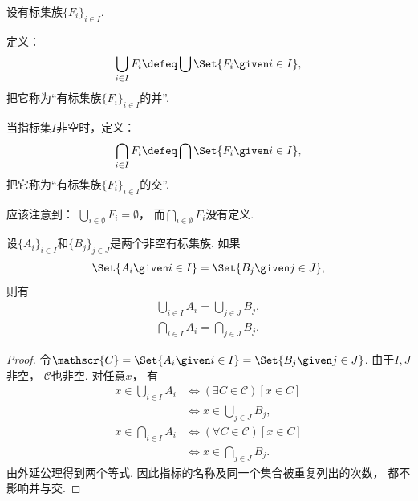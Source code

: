 \begin{definition}
设有标集族\(\{F_i\}_{i \in I}\).

定义：\begin{equation}
	\bigcup_{i \in I} F_i
	\defeq
	\bigcup\Set{ F_i \given i \in I },
\end{equation}
把它称为“有标集族\(\{F_i\}_{i \in I}\)的并”.

当指标集\(I\)非空时，定义：
\begin{equation}
	\bigcap_{i \in I} F_i
	\defeq
	\bigcap\Set{ F_i \given i \in I },
\end{equation}
把它称为“有标集族\(\{F_i\}_{i \in I}\)的交”.
\end{definition}
应该注意到：
\(\bigcup_{i \in \emptyset} F_i = \emptyset\)，
而\(\bigcap_{i \in \emptyset} F_i\)没有定义.

\begin{theorem}
    设\(\{A_i\}_{i \in I}\)和\(\{B_j\}_{j \in J}\)是两个非空有标集族.
    如果
    \begin{equation*}
        \Set{ A_i \given i \in I }
        = \Set{ B_j \given j \in J },
    \end{equation*}
    则有
    \begin{gather}
        \bigcup_{i \in I} A_i = \bigcup_{j \in J} B_j, \\
        \bigcap_{i \in I} A_i = \bigcap_{j \in J} B_j.
    \end{gather}
    \begin{proof}
        令\(\mathscr{C}=\Set{A_i\given i\in I}=\Set{B_j\given j\in J}\).
        由于\(I,J\)非空，
        \(\mathscr{C}\)也非空.
        对任意\(x\)，
        有
        \begin{align*}
            x\in\bigcup_{i\in I}A_i
            &\iff(\exists C\in\mathscr{C})[x\in C] \\
            &\iff x\in\bigcup_{j\in J}B_j, \\
            x\in\bigcap_{i\in I}A_i
            &\iff(\forall C\in\mathscr{C})[x\in C] \\
            &\iff x\in\bigcap_{j\in J}B_j.
        \end{align*}
        由外延公理得到两个等式.
        因此指标的名称及同一个集合被重复列出的次数，
        都不影响并与交.
    \end{proof}
\end{theorem}


